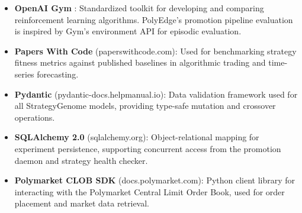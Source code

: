 \documentclass[11pt]{article}
\begin{document}
\begin{itemize}
    \item \textbf{OpenAI Gym} \citep{brockman2016openai}: Standardized toolkit for developing and comparing reinforcement learning algorithms. PolyEdge's promotion pipeline evaluation is inspired by Gym's environment API for episodic evaluation.

    \item \textbf{Papers With Code} (paperswithcode.com): Used for benchmarking strategy fitness metrics against published baselines in algorithmic trading and time-series forecasting.

    \item \textbf{Pydantic} (pydantic-docs.helpmanual.io): Data validation framework used for all StrategyGenome models, providing type-safe mutation and crossover operations.

    \item \textbf{SQLAlchemy 2.0} (sqlalchemy.org): Object-relational mapping for experiment persistence, supporting concurrent access from the promotion daemon and strategy health checker.

    \item \textbf{Polymarket CLOB SDK} (docs.polymarket.com): Python client library for interacting with the Polymarket Central Limit Order Book, used for order placement and market data retrieval.
\end{itemize}



\end{document}
